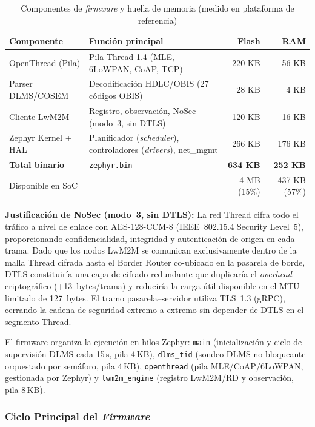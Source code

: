 \begin{table}[H]
\centering
\caption{Componentes de \emph{firmware} y huella de memoria (medido en plataforma de referencia)}
\label{tab:firmware-componentes}
\footnotesize
\begin{tabular}{|l|l|r|r|}
\hline
\rowcolor{gray!20}
\textbf{Componente} & \textbf{Función principal} & \textbf{Flash} & \textbf{RAM} \\
\hline
OpenThread (Pila) & Pila Thread 1.4 (MLE, 6LoWPAN, CoAP, TCP) & 220 KB & 56 KB \\
\hline
Parser DLMS/COSEM & Decodificación HDLC/OBIS (27 códigos OBIS) & 28 KB & 4 KB \\
\hline
Cliente LwM2M & Registro, observación, NoSec (modo~3, sin DTLS) & 120 KB & 16 KB \\
\hline
Zephyr Kernel + HAL & Planificador (\emph{scheduler}), controladores (\emph{drivers}), net\_mgmt & 266 KB & 176 KB \\
\hline
\textbf{Total binario} & \texttt{zephyr.bin} & \textbf{634 KB} & \textbf{252 KB} \\
\hline
\multicolumn{2}{|l|}{Disponible en SoC} & 4 MB (15\%) & 437 KB (57\%) \\
\hline
\end{tabular}
\end{table}

\textbf{Justificación de NoSec (modo~3, sin DTLS):} La red Thread cifra todo el tráfico a nivel de enlace con AES-128-CCM-8 (IEEE~802.15.4 Security Level~5), proporcionando confidencialidad, integridad y autenticación de origen en cada trama. Dado que los nodos LwM2M se comunican exclusivamente dentro de la malla Thread cifrada hasta el Border Router co-ubicado en la pasarela de borde, DTLS constituiría una capa de cifrado redundante que duplicaría el \emph{overhead} criptográfico (+13~bytes/trama) y reduciría la carga útil disponible en el MTU limitado de 127~bytes. El tramo pasarela--servidor utiliza TLS~1.3 (gRPC), cerrando la cadena de seguridad extremo a extremo sin depender de DTLS en el segmento Thread.

El firmware organiza la ejecución en hilos Zephyr: \texttt{main} (inicialización y ciclo de supervisión DLMS cada 15\,s, pila 4\,KB), \texttt{dlms\_tid} (sondeo DLMS no bloqueante orquestado por semáforo, pila 4\,KB), \texttt{openthread} (pila MLE/CoAP/6LoWPAN, gestionada por Zephyr) y \texttt{lwm2m\_engine} (registro LwM2M/RD y observación, pila 8\,KB).

\subsubsection{Ciclo Principal del \emph{Firmware}}
\label{sec:nodo-firmware-main}
\label{sec:nodo-firmware-componentes}

